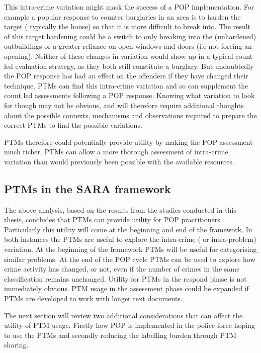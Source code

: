 This intra-crime variation might mask the success of a POP implementation. For example a popular response to counter burglaries in an area is to harden the target ( typically the house) so that it is more difficult to break into. The result of this target hardening could be a switch to only breaking into the (unhardened) outbuildings or a greater reliance on open windows and doors (i.e not forcing an opening). Neither of these changes in variation would show up in a typical count led evaluation strategy, as they both still constitute a burglary. But undoubtedly the POP response has had an effect on the offenders if they have changed their technique. PTMs can find this intra-crime variation and so can supplement the count led assessments following a POP response. Knowing what variation to look for though may not be obvious, and will therefore require additional thoughts about the possible contexts, mechanisms and observations required \parencite{pawson1997realistic} to prepare the correct PTMs to find the possible variations.

PTMs therefore could potentially provide utility by making the POP assessment much richer. PTMs can allow a more thorough assessment of intra-crime variation than would previously been possible with the available resources. 


\subsection{PTMs in the SARA framework} The above analysis, based on the results from the studies conducted in this thesis, concludes that PTMs can provide utility for POP practitioners. Particularly this utility will come at the beginning and end of the framework. In both instances the PTMs are useful to explore the intra-crime ( or intra-problem) variation. At the beginning of the framework  PTMs will be useful for categorising similar problems. At the end of the POP cycle PTMs can be used to explore how crime activity has changed, or not, even if the number of crimes in the same classification remains unchanged. Utility for PTMs in the respond phase is not immediately obvious. PTM usage in the assessment phase could be expanded if PTMs are developed to work with longer text documents. 

The next section will review two additional considerations that can affect the utility of PTM usage. Firstly how POP is implemented in the police force hoping to use the PTMs and secondly reducing the labelling burden through PTM sharing.

